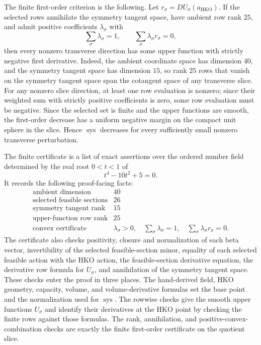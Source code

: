 The finite first-order criterion is the following. Let
\(r_\sigma=D U_\sigma(a_{\mathrm{HKO}})\). If the selected rows annihilate the
symmetry tangent space, have ambient row rank \(25\), and admit positive
coefficients \(\lambda_\sigma\) with
\[
  \sum_\sigma\lambda_\sigma=1,
  \qquad
  \sum_\sigma\lambda_\sigma r_\sigma=0,
\]
then every nonzero transverse direction has some upper function with strictly
negative first derivative. Indeed, the ambient coordinate space has dimension
\(40\), and the symmetry tangent space has dimension \(15\), so rank \(25\)
rows that vanish on the symmetry tangent space span the cotangent space of any
transverse slice. For any nonzero slice direction, at least one row evaluation
is nonzero; since their weighted sum with strictly positive coefficients is
zero, some row evaluation must be negative.
Since the selected set is finite and the upper functions are
smooth, the first-order decrease has a uniform negative margin on the compact
unit sphere in the slice. Hence \(\operatorname{sys}\) decreases for every
sufficiently small nonzero transverse perturbation.

The finite certificate is a list of exact assertions over the ordered number
field determined by the real root \(0<t<1\) of
\[
  t^4-10t^2+5=0.
\]
It records the following proof-facing facts:
\[
\begin{array}{ll}
\text{ambient dimension} & 40\\
\text{selected feasible sections} & 26\\
\text{symmetry tangent rank} & 15\\
\text{upper-function row rank} & 25\\
\text{convex certificate} &
  \lambda_\sigma>0,\quad
  \sum_\sigma\lambda_\sigma=1,\quad
  \sum_\sigma\lambda_\sigma r_\sigma=0.
\end{array}
\]
The certificate also checks positivity, closure and normalization of each beta
vector, invertibility of the selected feasible-section minor, equality of each
selected feasible action with the HKO action, the feasible-section derivative
equation, the derivative row formula for \(U_\sigma\), and annihilation of the
symmetry tangent space. These checks enter the proof in three places. The
hand-derived field, HKO geometry, capacity, volume, and volume-derivative
formulas set the base point and the normalization used for
\(\operatorname{sys}\). The rowwise checks give the smooth upper functions
\(U_\sigma\) and identify their derivatives at the HKO point by
checking the finite rows against those formulas. The rank, annihilation, and
positive-convex-combination checks are exactly the finite first-order
certificate on the quotient slice.

